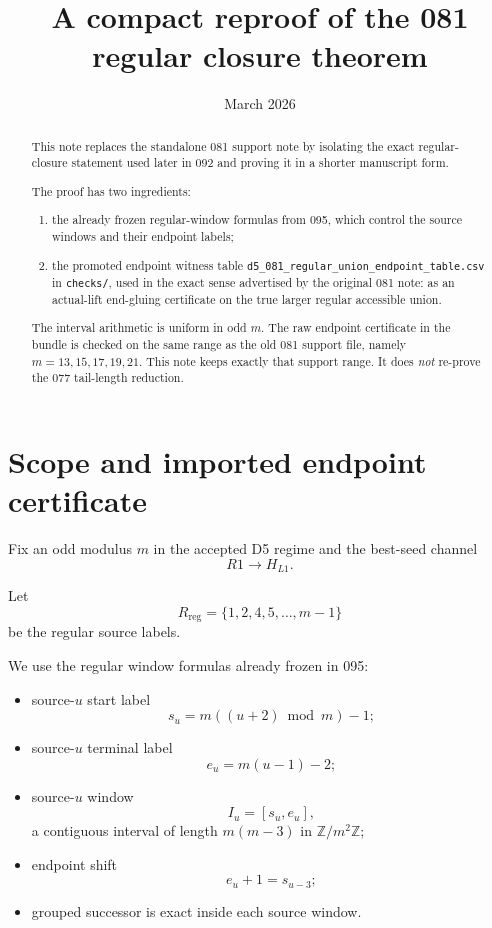 \documentclass[11pt]{article}
\title{A compact reproof of the 081 regular closure theorem}
\author{}
\date{March 2026}
\newcommand{\Z}{\mathbb Z}
\newcommand{\Rreg}{R_{\mathrm{reg}}}
\begin{document}
\maketitle

\begin{abstract}
This note replaces the standalone 081 support note by isolating the exact
regular-closure statement used later in 092 and proving it in a shorter
manuscript form.

The proof has two ingredients:
\begin{enumerate}[label=\textup{(\arabic*)},leftmargin=2.5em]
\item the already frozen regular-window formulas from 095, which control the
      source windows and their endpoint labels;
\item the promoted endpoint witness table
      \texttt{d5\_081\_regular\_union\_endpoint\_table.csv} in \texttt{checks/},
      used in the exact sense advertised by the original 081 note: as an
      actual-lift end-gluing certificate on the true larger regular accessible
      union.
\end{enumerate}

The interval arithmetic is uniform in odd $m$. The raw endpoint certificate in
the bundle is checked on the same range as the old 081 support file, namely
$m=13,15,17,19,21$. This note keeps exactly that support range. It does
\emph{not} re-prove the 077 tail-length reduction.
\end{abstract}

\section{Scope and imported endpoint certificate}

Fix an odd modulus $m$ in the accepted D5 regime and the best-seed channel
\[
R1 \to H_{L1}.
\]

Let
\[
\Rreg = \{1,2,4,5,\dots,m-1\}
\]
be the regular source labels.

We use the regular window formulas already frozen in 095:
\begin{itemize}[leftmargin=2em]
\item source-$u$ start label
      \[
      s_u = m((u+2) \bmod m) - 1;
      \]
\item source-$u$ terminal label
      \[
      e_u = m(u-1)-2;
      \]
\item source-$u$ window
      \[
      I_u = [s_u,e_u],
      \]
      a contiguous interval of length $m(m-3)$ in $\Z/m^2\Z$;
\item endpoint shift
      \[
      e_u + 1 = s_{u-3};
      \]
\item grouped successor is exact inside each source window.
\end{itemize}
\end{document}

